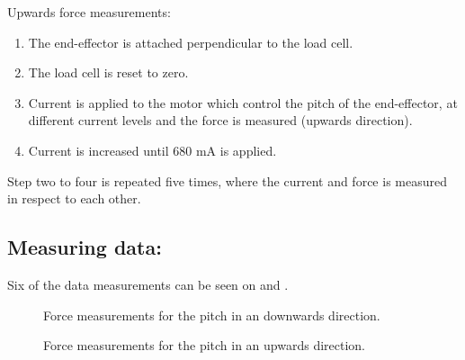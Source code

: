 Upwards force measurements:
\begin{enumerate}
\item The end-effector is attached perpendicular to the load cell. 
\item The load cell is reset to zero.
\item Current is applied to the motor which control the pitch of the end-effector, at different current levels and the force is measured (upwards direction).
\item Current is increased until 680 mA is applied.
\end{enumerate}
Step two to four is repeated five times, where the current and force is measured in respect to each other. 

\subsection*{Measuring data:}
Six of the data measurements can be seen on  and .

\begin{figure}[H]
\centering

\caption{Force measurements for the pitch in an downwards direction.}
\label{fig:pitch_down}
\end{figure}

\begin{figure}[H]
\centering

\caption{Force measurements for the pitch in an upwards direction.}
\label{fig:pitch_up}
\end{figure}





